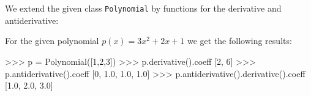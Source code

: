 \section{}

We extend the given class \texttt{Polynomial} by functions for the derivative and antiderivative:



%         
%     
%     
%     
%     

For the given polynomial $p(x) = 3 x^2 + 2 x + 1$ we get the following results:

\begin{consoleoutput}
    >>> p = Polynomial([1,2,3])
    >>> p.derivative().coeff
    [2, 6]
    >>> p.antiderivative().coeff
    [0, 1.0, 1.0, 1.0]
    >>> p.antiderivative().derivative().coeff
    [1.0, 2.0, 3.0]
\end{consoleoutput}




